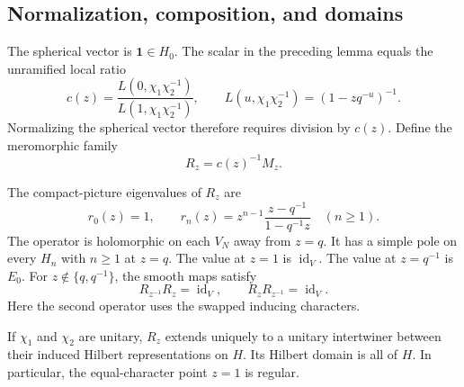 \subsection{Normalization, composition, and domains}

The spherical vector is $\mathbf1\in H_0$.
The scalar in the preceding lemma equals the unramified local ratio
\[
 c(z)=\frac{L(0,\chi_1\chi_2^{-1})}
 {L(1,\chi_1\chi_2^{-1})},\qquad
 L(u,\chi_1\chi_2^{-1})=(1-zq^{-u})^{-1}.
\]
Normalizing the spherical vector therefore requires division by $c(z)$.
Define the meromorphic family
\begin{equation}
\label{v4-arith:eis:normalized-intertwiner}
 R_z=c(z)^{-1}M_z.
\end{equation}

\begin{theorem}
\label{v4-arith:eis:normalized-theorem}
\label{v4-arith:w6-d:prop:local-FE}
The compact-picture eigenvalues of $R_z$ are
\begin{equation}
\label{v4-arith:eis:normalized-eigenvalues}
 r_0(z)=1,\qquad
 r_n(z)=z^{n-1}\frac{z-q^{-1}}{1-q^{-1}z}\quad(n\ge1).
\end{equation}
The operator is holomorphic on each $V_N$ away from $z=q$.
It has a simple pole on every $H_n$ with $n\ge1$ at $z=q$.
The value at $z=1$ is $\operatorname{id}_V$.
The value at $z=q^{-1}$ is $E_0$.
For $z\notin\{q,q^{-1}\}$, the smooth maps satisfy
\[
 R_{z^{-1}}R_z=\operatorname{id}_V,
 \qquad R_zR_{z^{-1}}=\operatorname{id}_V.
\]
Here the second operator uses the swapped inducing characters.

If $\chi_1$ and $\chi_2$ are unitary, $R_z$ extends uniquely to a
unitary intertwiner between their induced Hilbert representations on $H$.
Its Hilbert domain is all of $H$.
In particular, the equal-character point $z=1$ is regular.
\end{theorem}

